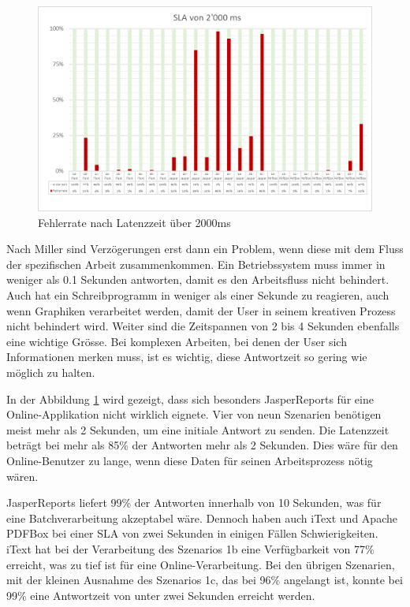 \documentclass[main.tex]{subfiles}
\begin{document}
\begin{figure}[!ht]
\includegraphics[width=\textwidth]{mainpart/4_analyse_img/latencySLA2000.png}
 \caption{Fehlerrate nach Latenzzeit über 2000ms}
 \label{figure:latencySLA2000}
\end{figure}


Nach Miller \cite[Seite~270]{miller_1968} sind Verzögerungen erst dann ein Problem, wenn diese mit dem Fluss der spezifischen Arbeit zusammenkommen. Ein Betriebssystem muss immer in weniger als 0.1 Sekunden antworten, damit es den Arbeitsfluss nicht behindert. Auch hat ein Schreibprogramm in weniger als einer Sekunde zu reagieren, auch wenn Graphiken verarbeitet werden, damit der User in seinem kreativen Prozess nicht behindert wird. Weiter sind die Zeitspannen von 2 bis 4 Sekunden ebenfalls eine wichtige Grösse. Bei komplexen Arbeiten, bei denen der User sich Informationen merken muss, ist es wichtig, diese Antwortzeit so gering wie möglich zu halten.

In der Abbildung \ref{figure:latencySLA2000} wird gezeigt, dass sich besonders JasperReports für eine Online-Applikation nicht wirklich eignete. Vier von neun Szenarien benötigen meist mehr als 2 Sekunden, um eine initiale Antwort zu senden. Die Latenzzeit beträgt bei mehr als 85\% der Antworten mehr als 2 Sekunden. Dies wäre für den Online-Benutzer zu lange, wenn diese Daten für seinen Arbeitsprozess nötig wären.

JasperReports liefert 99\% der Antworten innerhalb von 10 Sekunden, was für eine Batchverarbeitung akzeptabel wäre. Dennoch haben auch iText und Apache PDFBox bei einer SLA von zwei Sekunden in einigen Fällen Schwierigkeiten. iText hat bei der Verarbeitung des Szenarios 1b eine Verfügbarkeit von 77\% erreicht, was zu tief ist für eine Online-Verarbeitung. Bei den übrigen Szenarien, mit der kleinen Ausnahme des Szenarios 1c, das bei 96\% angelangt ist, konnte bei 99\% eine Antwortzeit von unter zwei Sekunden erreicht werden.
\end{document}
